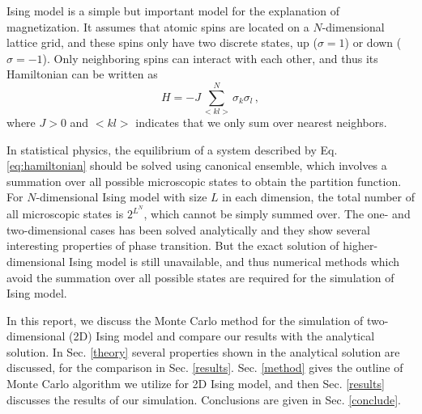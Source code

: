 Ising model is a simple but important model for the explanation of magnetization. 
It assumes that atomic spins are located on a $N$-dimensional lattice grid, 
and these spins only have two discrete states, up ($\sigma=1$) or down ($\sigma=-1$). 
Only neighboring spins can interact with each other, and thus its Hamiltonian can be written as 
\begin{equation}\label{eq:hamiltonian}
H=-J\sum_{<kl>}^{N}\sigma_k\sigma_l\,,
\end{equation}
where $J>0$ and $<kl>$ indicates that we only sum over nearest neighbors. 
\par
In statistical physics, the equilibrium of a system described by Eq. \ref{eq:hamiltonian} should be solved using canonical ensemble, 
which involves a summation over all possible microscopic states to obtain the partition function. 
For $N$-dimensional Ising model with size $L$ in each dimension, 
the total number of all microscopic states is $2^{L^N}$, which cannot be simply summed over. 
The one- and two-dimensional cases has been solved analytically and they show several interesting properties of phase transition. 
But the exact solution of higher-dimensional Ising model is still unavailable, 
and thus numerical methods which avoid the summation over all possible states are required for the simulation of Ising model. 
\par
In this report, we discuss the Monte Carlo method for the simulation of two-dimensional (2D) Ising model 
and compare our results with the analytical solution. 
In Sec. \ref{theory} several properties shown in the analytical solution are discussed, for the comparison in Sec. \ref{results}. 
Sec. \ref{method} gives the outline of Monte Carlo algorithm we utilize for 2D Ising model, 
and then Sec. \ref{results} discusses the results of our simulation. 
Conclusions are given in Sec. \ref{conclude}. 
